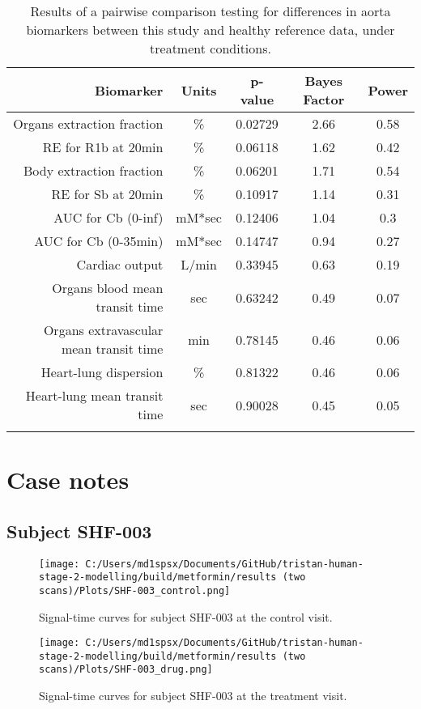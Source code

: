 \documentclass{epflreport}%
\begin{document}
\begin{longtable}{rcccc}%
\hline%
Biomarker&Units&p{-}value&Bayes Factor&Power\\%
\hline%
Organs extraction fraction&\%&0.02729&2.66&0.58\\%
RE for R1b at 20min&\%&0.06118&1.62&0.42\\%
Body extraction fraction&\%&0.06201&1.71&0.54\\%
RE for Sb at 20min&\%&0.10917&1.14&0.31\\%
AUC for Cb (0{-}inf)&mM*sec&0.12406&1.04&0.3\\%
AUC for Cb (0{-}35min)&mM*sec&0.14747&0.94&0.27\\%
Cardiac output&L/min&0.33945&0.63&0.19\\%
Organs blood mean transit time&sec&0.63242&0.49&0.07\\%
Organs extravascular mean transit time&min&0.78145&0.46&0.06\\%
Heart{-}lung dispersion&\%&0.81322&0.46&0.06\\%
Heart{-}lung mean transit time&sec&0.90028&0.45&0.05\\%
\hline%
\caption{Results of a pairwise comparison testing for differences in aorta biomarkers between this study and healthy reference data, under treatment conditions.} \\%
\end{longtable}%
\clearpage%
\section{Case notes}%
\label{sec:Casenotes}%

%
\subsection{Subject SHF{-}003}%
\label{subsec:SubjectSHF{-}003}%

%


\begin{figure}[h!]%
\centering%
\texttt{[image: C:/Users/md1spsx/Documents/GitHub/tristan-human-stage-2-modelling/build/metformin/results (two scans)/Plots/SHF-003\_control.png]}%
\caption{Signal{-}time curves for subject SHF{-}003 at the control visit.}%
\end{figure}

%


\begin{figure}[h!]%
\centering%
\texttt{[image: C:/Users/md1spsx/Documents/GitHub/tristan-human-stage-2-modelling/build/metformin/results (two scans)/Plots/SHF-003\_drug.png]}%
\caption{Signal{-}time curves for subject SHF{-}003 at the treatment visit.}%
\end{figure}
\end{document}
